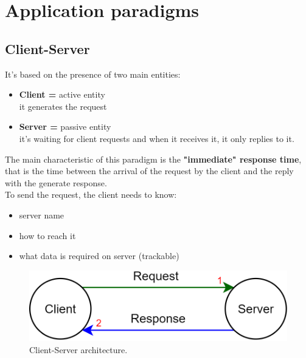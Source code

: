 \section{Application paradigms}
\subsection{Client-Server}
It's based on the presence of two main entities:
\begin{itemize}
\item{\textbf{Client =} active entity\\
it generates the request
}
\item{\textbf{Server =} passive entity\\
it's waiting for client requests and when it receives it, it only replies to it.
}
\end{itemize}
The main characteristic of this paradigm is the \textbf{"immediate" response time}, that is the time between the arrival of the request by the client and the reply with the generate response.\\
To send the request, the client needs to know:
\begin{itemize}
\item{server name}
\item{how to reach it}
\item{what data is required on server (trackable)}
\end{itemize}
\begin{figure}[h]
\centering
\includegraphics[scale=0.25]{Images/OSI/client_server}
\caption{\footnotesize{Client-Server architecture.}}\label{cs}
\end{figure}

